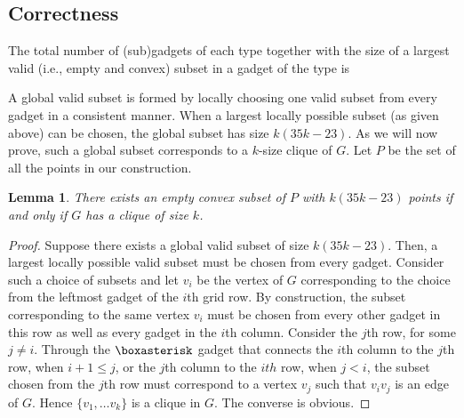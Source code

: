 \documentclass[11pt,a4paper]{article}
\newtheorem{lemma}[definition]{Lemma}
\let\boxminusnew\boxminus
\newcommand*{\boxangle}{\mathrel{
\vcenter{\offinterlineskip
\hbox{\scalebox{.76}[0.85]{$\righthalfcup$}}\vskip-.9ex\hbox{$\boxvoid$}}}}
\newcommand{\boxanglerota}{\rotatebox[origin=c]{90}{$\boxangle$}}
\newcommand{\boxanglerotb}{\rotatebox[origin=c]{270}{$\boxangle$}}
\newcommand{\boxtriangledown}{\rotatebox[origin=c]{180}{$\boxtriangleup$}}
\newcommand{\boxtriangleright}{\rotatebox[origin=c]{270}{$\boxtriangleup$}}
\newcommand{\boxtriangleleft}{\rotatebox[origin=c]{90}{$\boxtriangleup$}}
\newcommand{\boxvertnew}{\rotatebox[origin=c]{90}{$\boxminusnew$}}
\begin{document}
\subsection{Correctness}
The total number of (sub)gadgets of each type together with the size of a largest valid (i.e., empty and convex) subset in a gadget of the type is

A global valid subset is formed by locally choosing one valid subset from every gadget in a consistent manner. When a largest locally possible subset (as given above) can be chosen, the global subset has size $k(35k-23)$. As we will now prove, such a global subset corresponds to a $k$-size clique of $G$. Let $P$ be the set of all the points in our construction.


\begin{lemma}
There exists an empty convex subset of $P$ with $k(35k-23)$ points if and only if $G$ has a clique of size $k$.
\end{lemma}
\begin{proof}
Suppose there exists a global valid subset of size $k(35k-23)$. Then, a largest locally possible valid subset must be chosen from every gadget. Consider such a choice of subsets and let $v_i$ be the vertex of $G$ corresponding to the choice from the leftmost gadget of the $i$th grid row. By construction, the subset corresponding to the same vertex $v_i$ must be chosen from every other gadget in this row as well as every gadget in the $i$th column. Consider the $j$th row, for some $j\neq i$. Through the $\boxasterisk$ gadget that connects the $i$th column to the $j$th row, when $i+1\leq j$, or the $j$th column to the $ith$ row, when $j<i$, the subset chosen from the $j$th row must correspond to a vertex $v_j$ such that $v_iv_j$ is an edge of $G$. Hence $\{v_1,\ldots v_k\}$ is a clique in $G$. The converse is obvious.
\end{proof}
\end{document}
